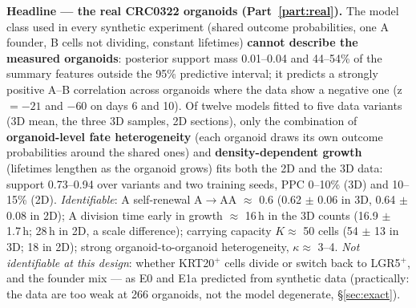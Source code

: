 \documentclass[10pt,a4paper]{article}
\begin{document}
\begin{keybox}
\textbf{Headline --- the real CRC0322 organoids (Part~\ref{part:real}).} The model class used in every synthetic experiment (shared outcome probabilities, one A founder, B cells not dividing, constant lifetimes) \textbf{cannot describe the measured organoids}: posterior support mass 0.01--0.04 and 44--54\% of the summary features outside the 95\% predictive interval; it predicts a strongly positive A--B correlation across organoids where the data show a negative one (z $=-21$ and $-60$ on days 6 and 10). Of twelve models fitted to five data variants (3D mean, the three 3D samples, 2D sections), only the combination of \textbf{organoid-level fate heterogeneity} (each organoid draws its own outcome probabilities around the shared ones) and \textbf{density-dependent growth} (lifetimes lengthen as the organoid grows) fits both the 2D and the 3D data: support 0.73--0.94 over variants and two training seeds, PPC 0--10\% (3D) and 10--15\% (2D). \emph{Identifiable}: A self-renewal A$\to$AA $\approx$ 0.6 (0.62 $\pm$ 0.06 in 3D, 0.64 $\pm$ 0.08 in 2D); A division time early in growth $\approx$ 16\,h in the 3D counts (16.9 $\pm$ 1.7\,h; 28\,h in 2D, a scale difference); carrying capacity $K \approx$ 50 cells (54 $\pm$ 13 in 3D; 18 in 2D); strong organoid-to-organoid heterogeneity, $\kappa \approx$ 3--4. \emph{Not identifiable at this design}: whether KRT20$^+$ cells divide or switch back to LGR5$^+$, and the founder mix --- as E0 and E1a predicted from synthetic data (practically: the data are too weak at 266 organoids, not the model degenerate, \S\ref{sec:exact}).
\end{keybox}
\end{document}
